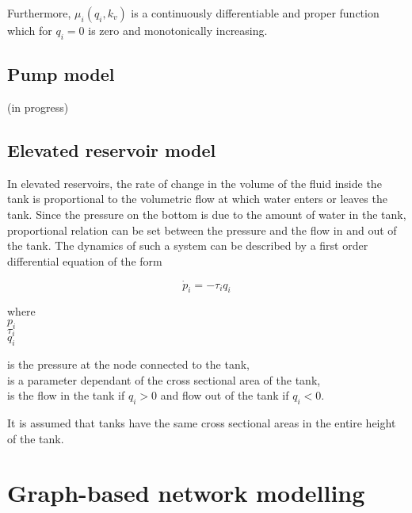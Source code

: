 Furthermore, $\mu_i(q_i,k_v)$ is a continuously differentiable and proper function which for $q_i = 0$ is zero and monotonically increasing.

\subsection{Pump model}
\label{pump_component}

(in progress)

\subsection{Elevated reservoir model}
\label{elevatedreservoir_component}

In elevated reservoirs, the rate of change in the volume of the fluid inside the tank is proportional to the volumetric flow at which water enters or leaves the tank. Since the pressure on the bottom is due to the amount of water in the tank, proportional relation can be set between the pressure and the flow in and out of the tank. The dynamics of such a system can be described by a first order differential equation of the form

\begin{equation}
\label{wt_model}
\dot{p}_i = -\tau_i q_i
\end{equation}

 \begin{minipage}[t]{0.20\textwidth}
where\\
\hspace*{8mm} $p_i$ \\
\hspace*{8mm} $\tau_i$ \\
\newline
\hspace*{8mm} $q_i$ 
\end{minipage}
\begin{minipage}[t]{0.68\textwidth}
\vspace*{2mm}
is the pressure at the node connected to the tank,\\ 
is a parameter dependant of the cross sectional area of the tank,\\
is the flow in the tank if $q_i > 0$ and flow out of the tank if $q_i < 0$.
\end{minipage}

It is assumed that tanks have the same cross sectional areas in the entire height of the tank. 

\section{Graph-based network modelling}
\label{graph_based_network_modelling}

